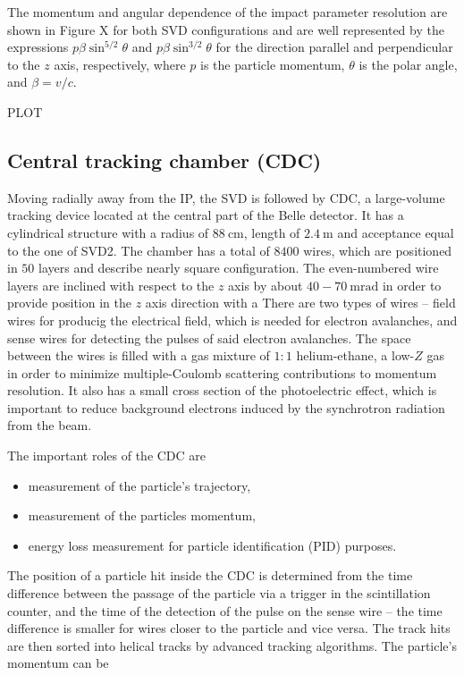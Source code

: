 \documentclass[headings=standardclasses,headings=big,oneside,a4paper,openany,12pt]{scrbook}
\newcommand {\e}[1]{\mathrm{~#1}}
\begin{document}
The momentum and angular dependence of the impact parameter resolution are shown in Figure X for both SVD configurations and are well represented by the expressions $p\beta \sin^{5/2}\theta$ and $p\beta \sin^{3/2}\theta$ for the direction parallel and perpendicular to the $z$ axis, respectively, where $p$ is the particle momentum, $\theta$ is the polar angle, and $\beta=v/c$.

PLOT


\subsection{Central tracking chamber (CDC)}

Moving radially away from the IP, the SVD is followed by CDC, a large-volume tracking device located at the central part of the Belle detector. It has a cylindrical structure with a radius of $88\e{cm}$, length of $2.4\e{m}$ and acceptance equal to the one of SVD2. The chamber has a total of $8400$ wires, which are positioned in $50$ layers and describe nearly square configuration. The even-numbered wire layers are inclined with respect to the $z$ axis by about $40-70\e{mrad}$ in order to provide position in the $z$ axis direction with a  There are two types of wires -- field wires for producig the electrical field, which is needed for electron avalanches, and sense wires for detecting the pulses of said electron avalanches. The space between the wires is filled with a gas mixture of $1:1$ helium-ethane, a low-$Z$ gas in order to minimize multiple-Coulomb scattering contributions to momentum resolution. It also has a small cross section of the photoelectric effect, which is important to reduce background electrons induced by the synchrotron radiation from the beam.

The important roles of the CDC are
\begin{itemize}
	\item measurement of the particle's trajectory,
	\item measurement of the particles momentum,
	\item energy loss measurement for particle identification (PID) purposes.
\end{itemize}
The position of a particle hit inside the CDC is determined from the time difference between the passage of the particle via a trigger in the scintillation counter, and the time of the detection of the pulse on the sense wire -- the time difference is smaller for wires closer to the particle and vice versa. The track hits are then sorted into helical tracks by advanced tracking algorithms. The particle's momentum can be 
\end{document}
